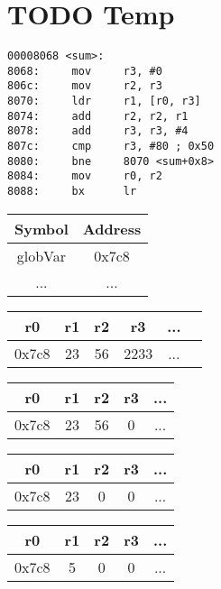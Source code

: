 \chapter{TODO Temp}

\begin{minipage}{.5\textwidth}
\begin{lstlisting}
00008068 <sum>:
8068:     mov     r3, #0
806c:     mov     r2, r3
8070:     ldr     r1, [r0, r3]
8074:     add     r2, r2, r1
8078:     add     r3, r3, #4
807c:     cmp     r3, #80 ; 0x50
8080:     bne     8070 <sum+0x8>
8084:     mov     r0, r2
8088:     bx      lr
\end{lstlisting}
\end{minipage}

\begin{tabular}{|c|c|}
  \hline
  \textbf{Symbol} & \textbf{Address} \\
    \hline
  globVar & 0x7c8  \\
  \hline
  ... & ... \\
    \hline
\end{tabular}

\begin{tabular}{|c|c|c|c|c|c|}
  \hline
  \textbf{r0} & \textbf{r1} & \textbf{r2} & \textbf{r3} & ... \\
    \hline
  0x7c8 & 23 & 56 & 2233 & ... \\
    \hline
\end{tabular}

\begin{tabular}{|c|c|c|c|c|}
  \hline
  \textbf{r0} & \textbf{r1} & \textbf{r2} & \textbf{r3} & ... \\
    \hline
  0x7c8 & 23 & 56 & 0 & ... \\
    \hline
\end{tabular}

\begin{tabular}{|c|c|c|c|c|}
  \hline
  \textbf{r0} & \textbf{r1} & \textbf{r2} & \textbf{r3} & ... \\
    \hline
  0x7c8 & 23 & 0 & 0 & ... \\
    \hline
\end{tabular}

\begin{tabular}{|c|c|c|c|c|}
  \hline
  \textbf{r0} & \textbf{r1} & \textbf{r2} & \textbf{r3} & ... \\
    \hline
  0x7c8 & 5 & 0 & 0 & ... \\
    \hline
\end{tabular}